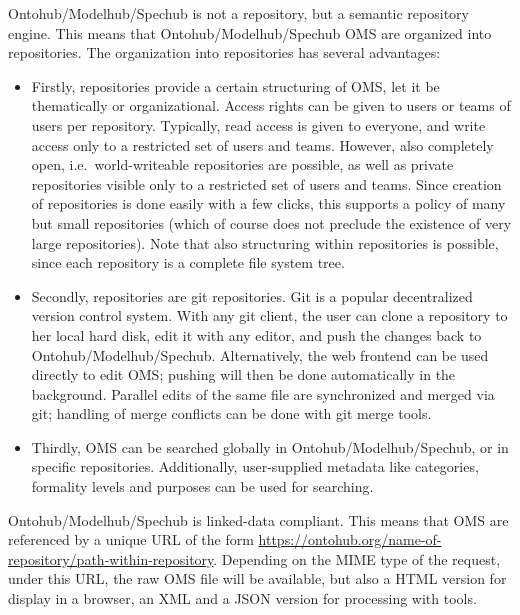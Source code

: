 \documentclass[10pt, a4paper]{isov2}
\begin{document}
Ontohub/Modelhub/Spechub is not a repository, but a semantic repository engine. This
means that Ontohub/Modelhub/Spechub OMS are organized into repositories.
The
organization into repositories has several advantages:
 \begin{itemize} 
\item
 Firstly, repositories provide a certain structuring of OMS,
 let it be thematically or organizational. Access rights can be given
 to users or teams of users per repository. Typically, read access is
 given to everyone, and write access only to a restricted set of users
 and teams. However, also completely open, i.e.\ world-writeable repositories
 are possible, as well as private repositories visible only to a
 restricted set of users and teams.  Since creation of repositories is
 done easily with a few clicks, this supports a policy of many but
 small repositories (which of course does not preclude the existence
 of very large repositories). Note that also structuring within
 repositories is possible, since each repository is a complete file
 system tree.

\item
 Secondly, repositories are git repositories. Git is a popular
 decentralized version control system. With any git client, the user
 can clone a repository to her local hard disk, edit it
 with any editor, and push the changes back to Ontohub/Modelhub/Spechub. Alternatively,
 the web frontend can be used directly to edit OMS; pushing
 will then be done automatically in the background. Parallel edits of
 the same file are synchronized and merged via git; handling of
 merge conflicts can be done with git merge tools.
\item
Thirdly, OMS can be searched globally in Ontohub/Modelhub/Spechub, or in
specific repositories. Additionally, user-supplied metadata like
categories, formality levels and purposes can be used for searching.
 \end{itemize} 

Ontohub/Modelhub/Spechub is linked-data compliant. This means that OMS are
referenced by a unique URL of the form
\url{https://ontohub.org/name-of-repository/path-within-repository}. Depending
on the MIME type of the request, under this URL, the raw OMS file
will be available, but also a HTML version for display in a browser, 
an XML and a JSON version for processing with tools.

\end{document}
